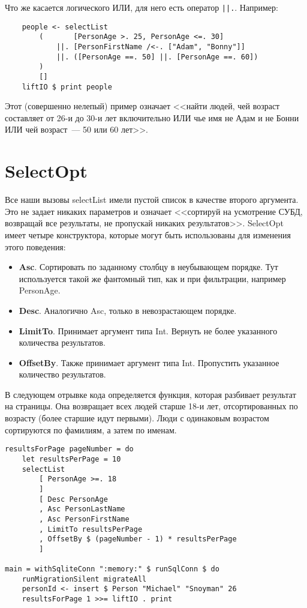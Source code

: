 Что же касается логического ИЛИ, для него есть оператор \lstinline'||.'. Например:

\begin{lstlisting}
    people <- selectList
        (       [PersonAge >. 25, PersonAge <=. 30]
            ||. [PersonFirstName /<-. ["Adam", "Bonny"]]
            ||. ([PersonAge ==. 50] ||. [PersonAge ==. 60])
        )
        []
    liftIO $ print people
\end{lstlisting}%

Этот (совершенно нелепый) пример означает <<найти людей, чей возраст составляет от 26-и до 30-и лет включительно ИЛИ чье имя не Адам и не Бонни ИЛИ чей возраст~--- 50 или 60 лет>>.

\section{SelectOpt}

Все наши вызовы selectList имели пустой список в качестве второго аргумента. Это не задает никаких параметров и означает <<сортируй на усмотрение СУБД, возвращай все результаты, не пропускай никаких результатов>>. SelectOpt имеет четыре конструктора, которые могут быть использованы для изменения этого поведения:

\begin{itemize}
\item {\bf Asc}. Сортировать по заданному столбцу в неубывающем порядке. Тут используется такой же фантомный тип, как и при фильтрации, например PersonAge.
\item {\bf Desc}. Аналогично Asc, только в невозрастающем порядке.
\item {\bf LimitTo}. Принимает аргумент типа Int. Вернуть не более указанного количества результатов.
\item {\bf OffsetBy}. Также принимает аргумент типа Int. Пропустить указанное количество результатов.
\end{itemize}

В следующем отрывке кода определяется функция, которая разбивает результат на страницы. Она возвращает всех людей старше 18-и лет, отсортированных по возрасту (более старшие идут первыми). Люди с одинаковым возрастом сортируются по фамилиям, а затем по именам.

\begin{lstlisting}
resultsForPage pageNumber = do
    let resultsPerPage = 10
    selectList
        [ PersonAge >=. 18
        ]
        [ Desc PersonAge
        , Asc PersonLastName
        , Asc PersonFirstName
        , LimitTo resultsPerPage
        , OffsetBy $ (pageNumber - 1) * resultsPerPage
        ]

main = withSqliteConn ":memory:" $ runSqlConn $ do
    runMigrationSilent migrateAll
    personId <- insert $ Person "Michael" "Snoyman" 26
    resultsForPage 1 >>= liftIO . print
\end{lstlisting}%

